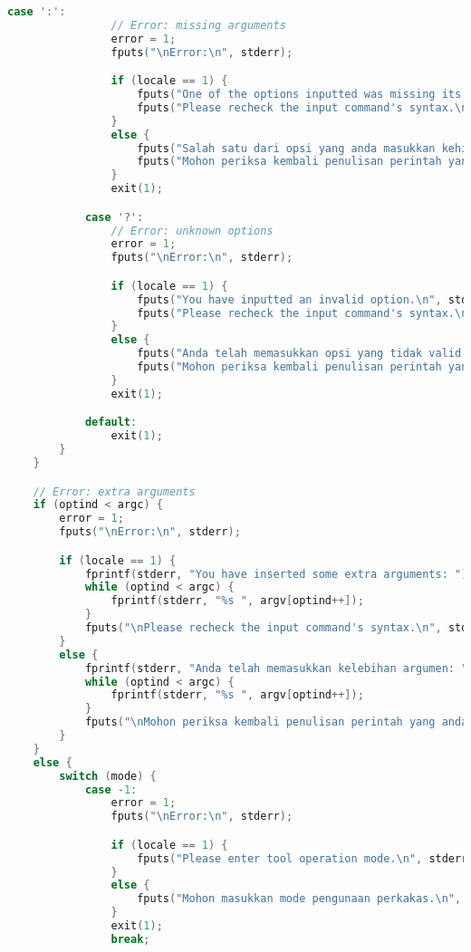 \begin{lstlisting}[label={appdx:A-main}, language=C, caption=Fungsi utama perkakas (\texttt{main})]
            case ':':
                // Error: missing arguments
                error = 1;
                fputs("\nError:\n", stderr);

                if (locale == 1) {
                    fputs("One of the options inputted was missing its required argument.\n", stderr);
                    fputs("Please recheck the input command's syntax.\n", stderr);
                }
                else {
                    fputs("Salah satu dari opsi yang anda masukkan kehilangan argumen yang dibutuhkan.\n", stderr);
                    fputs("Mohon periksa kembali penulisan perintah yang anda masukkan.\n", stderr);
                }
                exit(1);

            case '?':
                // Error: unknown options
                error = 1;
                fputs("\nError:\n", stderr);

                if (locale == 1) {
                    fputs("You have inputted an invalid option.\n", stderr);
                    fputs("Please recheck the input command's syntax.\n", stderr);
                }
                else {
                    fputs("Anda telah memasukkan opsi yang tidak valid.\n", stderr);
                    fputs("Mohon periksa kembali penulisan perintah yang anda masukkan.\n", stderr);
                }
                exit(1);

            default:
                exit(1);
        }
    }

    // Error: extra arguments
    if (optind < argc) {
        error = 1;
        fputs("\nError:\n", stderr);

        if (locale == 1) {
            fprintf(stderr, "You have inserted some extra arguments: ");
            while (optind < argc) {
                fprintf(stderr, "%s ", argv[optind++]);
            }
            fputs("\nPlease recheck the input command's syntax.\n", stderr);
        }
        else {
            fprintf(stderr, "Anda telah memasukkan kelebihan argumen: ");
            while (optind < argc) {
                fprintf(stderr, "%s ", argv[optind++]);
            }
            fputs("\nMohon periksa kembali penulisan perintah yang anda masukkan.\n", stderr);
        }
    }
    else {
        switch (mode) {
            case -1:
                error = 1;
                fputs("\nError:\n", stderr);

                if (locale == 1) {
                    fputs("Please enter tool operation mode.\n", stderr);
                }
                else {
                    fputs("Mohon masukkan mode pengunaan perkakas.\n", stderr);   
                }
                exit(1);
                break;


\end{lstlisting}
